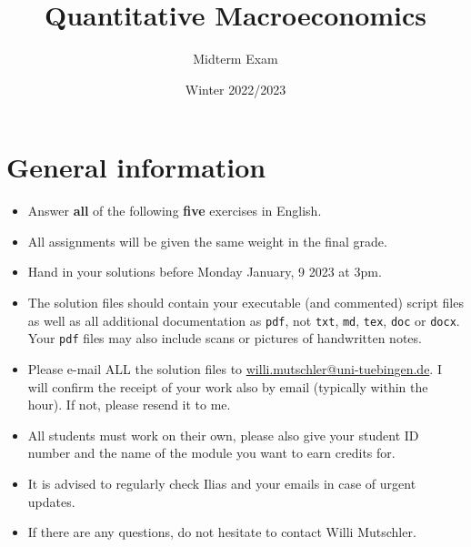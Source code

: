 \documentclass{article}
\begin{document}
	
\title{Quantitative Macroeconomics}
\author{Midterm Exam}
\date{Winter 2022/2023}
\maketitle

\section*{General information}
\begin{itemize}
	\item Answer \textbf{all} of the following \textbf{five} exercises in English.
	\item All assignments will be given the same weight in the final grade.
	\item Hand in your solutions before Monday January, 9 2023 at 3pm.
	\item The solution files should contain your executable (and commented) script files
		as well as all additional documentation as \texttt{pdf}, not \texttt{txt}, \texttt{md}, \texttt{tex}, \texttt{doc} or \texttt{docx}.
	Your \texttt{pdf} files may also include scans or pictures of handwritten notes.
	\item Please e-mail ALL the solution files to \url{willi.mutschler@uni-tuebingen.de}.
	I will confirm the receipt of your work also by email (typically within the hour). If not, please resend it to me.
	\item All students must work on their own, please also give your student ID number and the name of the module you want to earn credits for.
	\item It is advised to regularly check Ilias and your emails in case of urgent updates.
	\item If there are any questions, do not hesitate to contact Willi Mutschler.
\end{itemize}

\newpage

	
\end{document}
